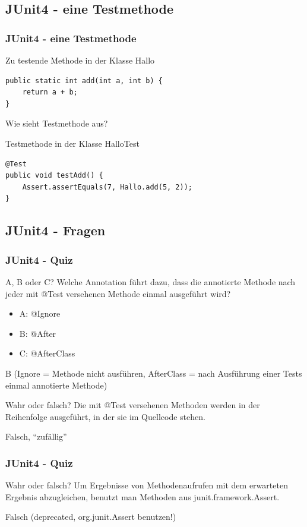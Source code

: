 \documentclass[18pt]{beamer}
\begin{document}
	\subsection{JUnit4 - eine Testmethode}
	\begin{frame}[fragile]
		\frametitle{JUnit4 - eine Testmethode}
		\begin{block}{Zu testende Methode in der Klasse Hallo}
			\begin{verbatim}
public static int add(int a, int b) { 
	return a + b;
}
			\end{verbatim}	
		\end{block} 
		\pause Wie sieht Testmethode aus? \pause
		\begin{block}{Testmethode in der Klasse HalloTest}
			\begin{verbatim}
@Test
public void testAdd() {
	Assert.assertEquals(7, Hallo.add(5, 2));
}
			\end{verbatim}
		
		\end{block}
\end{frame}
	
	\subsection{JUnit4 - Fragen}
	\begin{frame}
		\frametitle{JUnit4 - Quiz}
		\begin{block}{A, B oder C?}
			Welche Annotation führt dazu, dass die annotierte Methode nach jeder mit @Test versehenen Methode einmal ausgeführt wird?
			\begin{itemize}
				\item A: @Ignore
				\item B: @After
				\item C: @AfterClass
			\end{itemize}
		\end{block}
		\pause
		B (Ignore = Methode nicht ausführen, AfterClass = nach Ausführung einer Tests einmal annotierte Methode)
		\pause
		\begin{block}{Wahr oder falsch?}
			Die mit @Test versehenen Methoden werden in der Reihenfolge ausgeführt, in der sie im Quellcode stehen.
		\end{block}
		\pause
		Falsch, \enquote{zufällig}
	\end{frame}

	\begin{frame}
	\frametitle{JUnit4 - Quiz}
	\begin{block}{Wahr oder falsch?}
		Um Ergebnisse von Methodenaufrufen mit dem erwarteten Ergebnis abzugleichen, benutzt man Methoden aus junit.framework.Assert.
	\end{block}
	\pause
	Falsch (deprecated, org.junit.Assert benutzen!)
	
	\end{frame}
		
\end{document}
